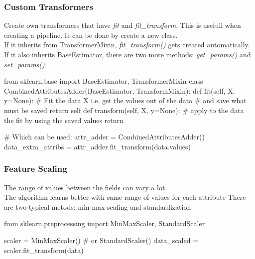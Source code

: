 \documentclass{article}
\begin{document}
    \subsubsection*{Custom Transformers}
      Create own transformers that have \emph{fit} and \emph{fit\_transform}. This is usefull when creating a pipeline. It can be done by create a new class.\\
      If it inherits from TransformerMixin, \emph{fit\_transform()} gets created automatically.
      If it also inherits BaseEstimator, there are two more methods: \emph{get\_params()} and \emph{set\_params()}

      \begin{python}
        from sklearn.base import BaseEstimator, TransformerMixin
        class CombinedAttributesAdder(BaseEstimator, TransformMixin):
        def fit(self, X, y=None):
          # Fit the data X i.e. get the values out of the data
          # and save what must be saved
          return self
          def transform(self, X, y=None):
          # apply to the data the fit by using the saved values
          return

          # Which can be used:
          attr_adder = CombinedAttributesAdder()
          data_extra_attribs = attr_adder.fit_transform(data.values)
      \end{python}

    \subsubsection*{Feature Scaling}
    The range of values between the fields can vary a lot.\\
    The algorithm learns better with same range of values for each attribute
    There are two typical metods: min-max scaling and standardization
    \begin{python}
      from sklearn.preprocessing import MinMaxScaler,
                                    StandardScaler

      scaler = MinMaxScaler()   # or StandardScaler()
      data_scaled = scaler.fit_transform(data)
    \end{python}
\end{document}
